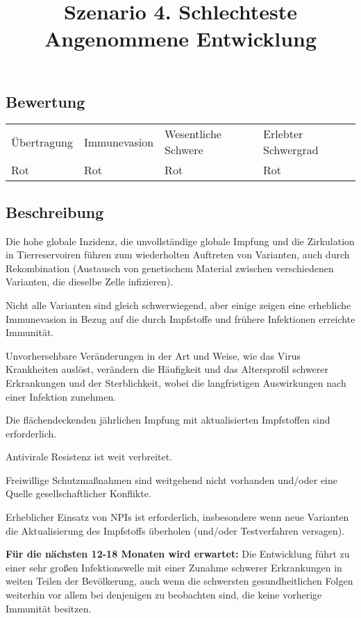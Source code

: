 \documentclass{article}
\begin{document}
\title{Szenario 4. Schlechteste Angenommene Entwicklung}

\maketitle





\subsection{Bewertung}\label{H9174878}



\begin{tabu} to \textwidth { |X|X|X|X| }
\hline



Übertragung   & Immunevasion & Wesentliche Schwere & Erlebter Schwergrad
 \\


Rot & Rot & Rot & Rot
 \\
\hline

\end{tabu}




\subsection{Beschreibung}\label{H1664473}



Die hohe globale Inzidenz, die unvollständige globale Impfung und die Zirkulation in Tierreservoiren führen zum wiederholten Auftreten von Varianten, auch durch Rekombination (Austausch von genetischem Material zwischen verschiedenen Varianten, die dieselbe Zelle infizieren). 


Nicht alle Varianten sind gleich schwerwiegend, aber einige zeigen eine erhebliche Immunevasion in Bezug auf die  durch Impfstoffe  und frühere Infektionen erreichte Immunität. 


Unvorhersehbare Veränderungen in der Art und Weise, wie das Virus Krankheiten auslöst, verändern die Häufigkeit und das Altersprofil schwerer Erkrankungen und der Sterblichkeit, wobei die langfristigen Auswirkungen nach einer Infektion zunehmen. 


Die flächendeckenden jährlichen Impfung mit aktualisierten Impfstoffen sind erforderlich. 


Antivirale Resistenz ist weit verbreitet. 


Freiwillige Schutzmaßnahmen sind weitgehend nicht vorhanden und/oder eine Quelle gesellschaftlicher Konflikte. 


Erheblicher Einsatz von NPIs ist erforderlich, insbesondere wenn neue Varianten die Aktualisierung des Impfstoffs überholen (und/oder Testverfahren versagen).


\textbf{Für die nächsten 12-18 Monaten wird erwartet:} Die Entwicklung führt zu einer sehr großen Infektionswelle mit einer Zunahme schwerer Erkrankungen in weiten Teilen der Bevölkerung, auch wenn die schwersten gesundheitlichen Folgen weiterhin vor allem bei denjenigen zu beobachten sind, die keine vorherige Immunität besitzen.
\end{document}
